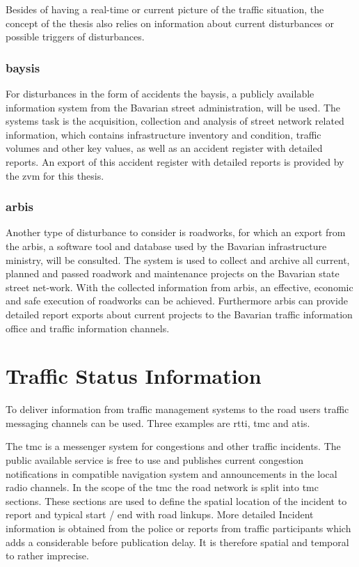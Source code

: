 \documentclass[a4paper,headsepline,footsepline,fontsize=11pt,BCOR=12mm,DIV=12]{report}
\begin{document}
Besides of having a real-time or current picture of the traffic situation, the concept of the thesis also relies on information about current disturbances or possible triggers of disturbances. 

\subsubsection{\acrfull{baysis}}
For disturbances in the form of accidents the \acrfull{baysis}, a publicly available information system from the Bavarian street administration, will be used. The systems task is the acquisition, collection and analysis of street network related information, which contains infrastructure inventory and condition, traffic volumes and other key values, as well as an accident register with detailed reports. An export of this accident register with detailed reports is provided by the \acrshort{zvm} for this thesis.

\subsubsection{\acrfull{arbis}}
Another type of disturbance to consider is roadworks, for which an export from the \acrfull{arbis}, a software tool and database used by the Bavarian infrastructure ministry, will be consulted. The system is used to collect and archive all current, planned and passed roadwork and maintenance projects on the Bavarian state street net-work. With the collected information from \acrshort{arbis}, an effective, economic and safe execution of roadworks can be achieved. Furthermore \acrshort{arbis} can provide detailed report exports about current projects to the Bavarian traffic information office and traffic information channels. \cite{trafficon2017}

\section{Traffic Status Information}

To deliver information from traffic management systems to the road users traffic messaging channels can be used. Three examples are \acrfull{rtti}, \acrfull{tmc} and \acrfull{atis}.

The \acrshort{tmc} is a messenger system for congestions and other traffic incidents. The public available service is free to use and publishes current congestion notifications in compatible navigation system and announcements in the local radio channels. In the scope of the \acrshort{tmc} the road network is split into \acrshort{tmc} sections. These sections are used to define the spatial location of the incident to report and typical start / end with road linkups. More detailed Incident information is obtained from the police or reports from traffic participants which adds a considerable before publication delay. It is therefore spatial and temporal to rather imprecise. \cite{LAPID2020}
\end{document}
